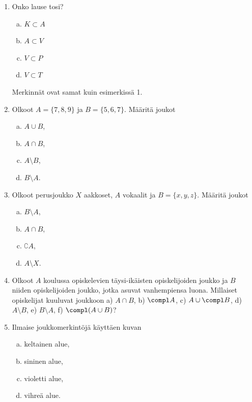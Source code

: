 


\Harjoitustehtavat

\begin{enumerate}

\item Onko lause tosi?
\begin{enumerate}[a)]
\item $K \subset A$
\item $A \subset V$
\item $V \subset P$
\item $V \subset T$
\end{enumerate}
Merkinnät ovat samat kuin esimerkissä 1.

\item Olkoot $A = \{7,8,9\}$ ja $B=\{5,6,7\}$. Määritä joukot
\begin{enumerate}[a)]
\item $A \cup B$,
\item $A \cap B$,
\item $A \setminus B$,
\item $B \setminus A$.
\end{enumerate}

\item Olkoot perusjoukko $X$ aakkoset, $A$ vokaalit ja $B=\{x,y,z\}$.
Määritä joukot
\begin{enumerate}[a)]
\item $B\setminus A$,
\item $A\cap B$,
\item $\complement A$,
\item $A \setminus X$.
\end{enumerate}


\item
Olkoot $A$ koulussa opiskelevien täysi-ikäisten opiskelijoiden joukko ja $B$ niiden opiskelijoiden joukko, jotka asuvat vanhempiensa luona. Millaiset opiskelijat kuuluvat joukkoon a) $A \cap B$,  b) $\compl A$, c) $A \cup \compl B$, d) $A\setminus B$, e) $B \setminus A$, f) $\compl (A \cup B)$?

\item
Ilmaise joukkomerkintöjä käyttäen kuvan
\begin{enumerate}[a)]
\item keltainen alue,
\item sininen alue,
\item violetti alue,
\item vihreä alue.
\end{enumerate}


\end{enumerate}
